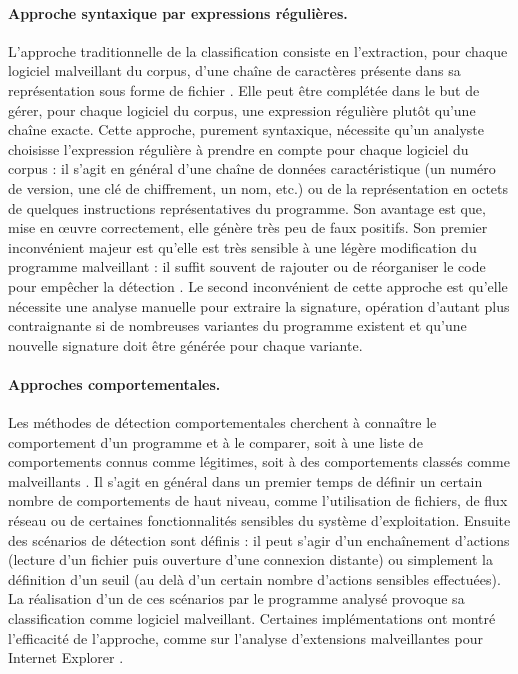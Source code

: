 \paragraph{Approche syntaxique par expressions régulières.}
L'approche traditionnelle de la classification consiste en l'extraction, pour chaque logiciel malveillant du corpus, d'une chaîne de caractères présente dans sa représentation sous forme de fichier \cite{Szor05}.
Elle peut être complétée dans le but de gérer, pour chaque logiciel du corpus, une expression régulière plutôt qu'une chaîne exacte.
Cette approche, purement syntaxique, nécessite qu'un analyste choisisse l'expression régulière à prendre en compte pour chaque logiciel du corpus : il s'agit en général d'une chaîne de données caractéristique (un numéro de version, une clé de chiffrement, un nom, etc.) ou de la représentation en octets de quelques instructions représentatives du programme.
Son avantage est que, mise en \oe uvre correctement, elle génère très peu de faux positifs. Son premier inconvénient majeur est qu'elle est très sensible à une légère modification du programme malveillant : il suffit souvent de rajouter ou de réorganiser le code pour empêcher la détection \cite{CJ04}. Le second inconvénient de cette approche est qu'elle nécessite une analyse manuelle pour extraire la signature, opération d'autant plus contraignante si de nombreuses variantes du programme existent et qu'une nouvelle signature doit être générée pour chaque variante.

\paragraph{Approches comportementales.}
Les méthodes de détection comportementales cherchent à connaître le comportement d'un programme et à le comparer, soit à une liste de comportements connus comme légitimes, soit à des comportements classés comme malveillants \cite{JDF08}.
Il s'agit en général dans un premier temps de définir un certain nombre de comportements de haut niveau, comme l'utilisation de fichiers, de flux réseau ou de certaines fonctionnalités sensibles du système d'exploitation.
Ensuite des scénarios de détection sont définis : il peut s'agir d'un enchaînement d'actions (lecture d'un fichier puis ouverture d'une connexion distante) ou simplement la définition d'un seuil (au delà d'un certain nombre d'actions sensibles effectuées).
La réalisation d'un de ces scénarios par le programme analysé provoque sa classification comme logiciel malveillant.
Certaines implémentations ont montré l'efficacité de l'approche, comme sur l'analyse d'extensions malveillantes pour Internet Explorer \cite{KKBVK06}.

